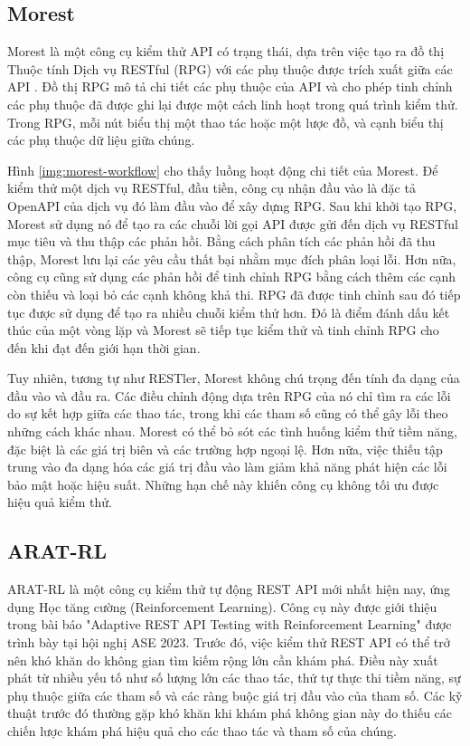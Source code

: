 \subsection{Morest}
Morest là một công cụ kiểm thử API có trạng thái, dựa trên việc tạo ra đồ thị Thuộc tính Dịch vụ RESTful (RPG) với các phụ thuộc được trích xuất giữa các API \cite{liu2022morest}. Đồ thị RPG mô tả chi tiết các phụ thuộc của API và cho phép tinh chỉnh các phụ thuộc đã được ghi lại được một cách linh hoạt trong quá trình kiểm thử. Trong RPG, mỗi nút biểu thị một thao tác hoặc một lược đồ, và cạnh biểu thị các phụ thuộc dữ liệu giữa chúng.

Hình \ref{img:morest-workflow} cho thấy luồng hoạt động chi tiết của Morest. Để kiểm thử một dịch vụ RESTful, đầu tiền, công cụ nhận đầu vào là đặc tả OpenAPI của dịch vụ đó làm đầu vào để xây dựng RPG. Sau khi khởi tạo RPG, Morest sử dụng nó để tạo ra các chuỗi lời gọi API được gửi đến dịch vụ RESTful mục tiêu và thu thập các phản hồi.
Bằng cách phân tích các phản hồi đã thu thập, Morest lưu lại các yêu cầu thất bại nhằm mục đích phân loại lỗi. Hơn nữa, công cụ cũng sử dụng các phản hồi để tinh chỉnh RPG bằng cách thêm các cạnh còn thiếu và loại bỏ các cạnh không khả thi. RPG đã được tinh chỉnh sau đó tiếp tục được sử dụng để tạo ra nhiều chuỗi kiểm thử hơn. Đó là điểm đánh dấu kết thúc của một vòng lặp và Morest sẽ tiếp tục kiểm thử và tinh chỉnh RPG cho đến khi đạt đến giới hạn thời gian.


Tuy nhiên, tương tự như RESTler, Morest không chú trọng đến tính đa dạng của đầu vào và đầu ra. Các điều chỉnh động dựa trên RPG của nó chỉ tìm ra các lỗi do sự kết hợp giữa các thao tác, trong khi các tham số cũng có thể gây lỗi theo những cách khác nhau. Morest có thể bỏ sót các tình huống kiểm thử tiềm năng, đặc biệt là các giá trị biên và các trường hợp ngoại lệ. Hơn nữa, việc thiếu tập trung vào đa dạng hóa các giá trị đầu vào làm giảm khả năng phát hiện các lỗi bảo mật hoặc hiệu suất. Những hạn chế này khiến
công cụ không tối ưu được hiệu quả kiểm thử.
\subsection{ARAT-RL}


ARAT-RL là một công cụ kiểm thử tự động REST API mới nhất hiện nay, ứng dụng Học tăng cường (Reinforcement Learning). Công cụ này được giới thiệu trong bài báo "Adaptive REST API Testing with Reinforcement Learning" được trình bày tại hội nghị ASE 2023. Trước đó, việc kiểm thử REST API có thể trở nên khó khăn do không gian tìm kiếm rộng lớn cần khám phá. Điều này xuất phát từ nhiều yếu tố như số lượng lớn các thao tác, thứ tự thực thi tiềm năng, sự phụ thuộc giữa các tham số và các ràng buộc giá trị đầu vào của tham số. Các kỹ thuật trước đó thường gặp khó khăn khi khám phá không gian này do thiếu các chiến lược khám phá hiệu quả cho các thao tác và tham số của chúng.

